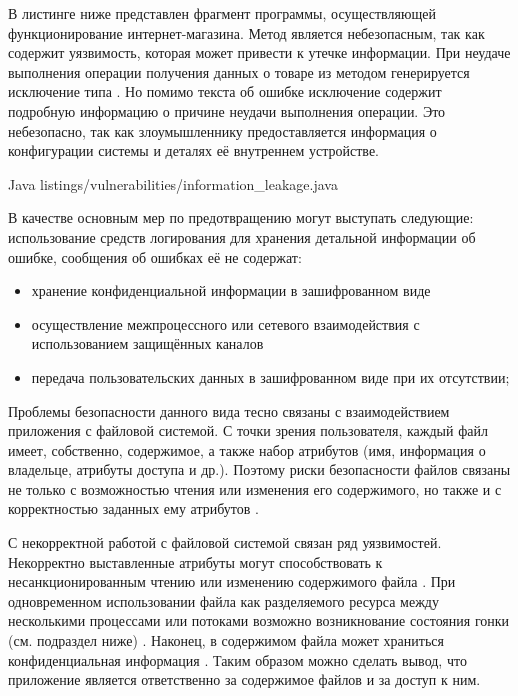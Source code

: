 %
В листинге ниже представлен фрагмент программы, осуществляющей функционирование интернет-магазина. 
%
Метод  является небезопасным, так как содержит уязвимость, которая может 
привести к утечке информации.
%
При неудаче выполнения операции получения данных о товаре из  методом 
генерируется исключение типа . 
%
Но помимо текста об ошибке исключение содержит подробную информацию о причине неудачи выполнения 
операции. 
%
Это небезопасно, так как злоумышленнику предоставляется информация о конфигурации системы и деталях 
её внутреннем устройстве. 

	{Java}
	{listings/vulnerabilities/information_leakage.java}

%
В качестве основным мер по предотвращению могут выступать следующие:
использование средств логирования для хранения детальной информации об ошибке, сообщения об ошибках 
её не содержат:
\begin{itemize}
	\item хранение конфиденциальной информации в зашифрованном виде
	\item осуществление межпроцессного или сетевого взаимодействия с использованием защищённых 
		каналов
	\item передача пользовательских данных в зашифрованном виде при их отсутствии;
\end{itemize}



%
Проблемы безопасности данного вида тесно связаны с взаимодействием приложения с файловой системой. 
%
С точки зрения пользователя, каждый файл имеет, собственно, содержимое, а также набор атрибутов 
(имя, информация о владельце, атрибуты доступа и др.). 
%
Поэтому риски безопасности файлов связаны не только с возможностью чтения или изменения его 
содержимого, но также и с корректностью заданных ему атрибутов .

%
С некорректной работой с файловой системой связан ряд уязвимостей. 
%
Некорректно выставленные атрибуты могут способствовать к несанкционированным чтению или изменению 
содержимого файла . 
%
При одновременном использовании файла как разделяемого ресурса между несколькими процессами или 
потоками возможно возникнование состояния гонки (см. подраздел ниже) . 
%
Наконец, в содержимом файла может храниться конфиденциальная информация . 
%
Таким образом можно сделать вывод, что приложение является ответственно за содержимое файлов 
и за доступ к ним.

